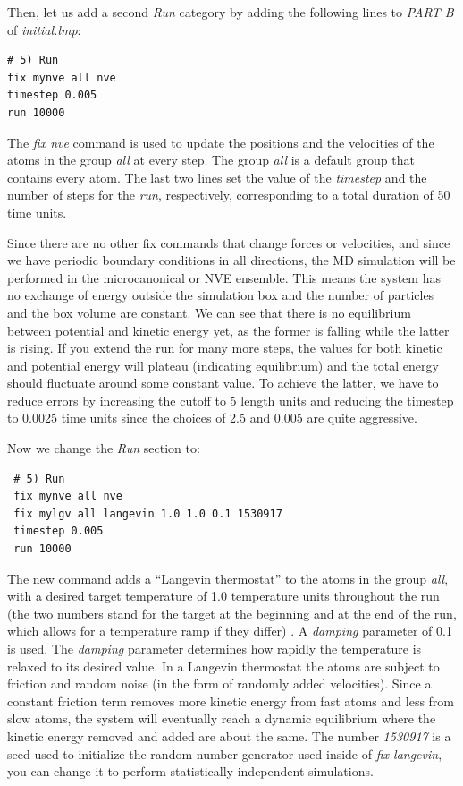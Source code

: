 \documentclass[9pt,tutorial]{livecoms}
\begin{document}
Then, let us add a second \textit{Run} category by adding the following
lines to \textit{PART B} of \textit{initial.lmp}:
\begin{lstlisting}
# 5) Run
fix mynve all nve
timestep 0.005
run 10000
\end{lstlisting}
The \textit{fix nve} command is used to update the positions and the
velocities of the atoms in the group \textit{all} at every step.  The
group \textit{all} is a default group that contains every atom.  The
last two lines set the value of the \textit{timestep} and the number of
steps for the \textit{run}, respectively, corresponding to a total
duration of 50 time units.

Since there are no other fix commands that change forces or velocities,
and since we have periodic boundary conditions in all directions, the MD
simulation will be performed in the microcanonical or NVE ensemble.
This means the system has no exchange of energy outside the simulation
box and the number of particles and the box volume are constant.  We can
see that there is no equilibrium between potential and kinetic energy
yet, as the former is falling while the latter is rising.  If you extend
the run for many more steps, the values for both kinetic and
potential energy will plateau (indicating equilibrium) and the total
energy should fluctuate around some constant value.  To achieve the
latter, we have to reduce errors by increasing the cutoff to 5 length
units and reducing the timestep to 0.0025 time units since the choices
of 2.5 and 0.005 are quite aggressive.

Now we change the \textit{Run} section to:
\begin{lstlisting}
 # 5) Run
 fix mynve all nve
 fix mylgv all langevin 1.0 1.0 0.1 1530917
 timestep 0.005
 run 10000
\end{lstlisting}

The new command adds a ``Langevin thermostat'' to the atoms in the group
\textit{all}, with a desired target temperature of 1.0 temperature units
throughout the run (the two numbers stand for the target at the beginning
and at the end of the run, which allows for a temperature ramp if
they differ) \cite{schneider1978molecular}.  A \textit{damping}
parameter of 0.1 is used.  The \textit{damping} parameter determines how
rapidly the temperature is relaxed to its desired value.  In a Langevin
thermostat the atoms are subject to friction and random noise (in the form
of randomly added velocities).  Since a constant friction term removes
more kinetic energy from fast atoms and less from slow atoms, the system
will eventually reach a dynamic equilibrium where the kinetic energy
removed and added are about the same.  The number \textit{1530917} is a
seed used to initialize the random number generator used inside of
\textit{fix langevin}, you can change it to perform statistically
independent simulations.
\end{document}
